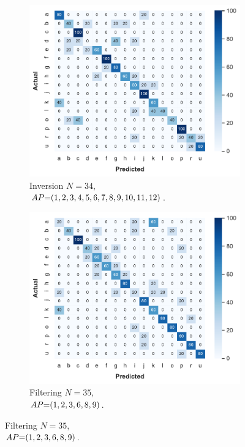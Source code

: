 \begin{figure}[!tb]
    \begin{subfigure}{.49\textwidth}
        \centering
        \includegraphics[width=.99\linewidth]{Figures/RadarExperiments/Datasets/SensorsComparison/Walabot/confusion-inversion.pdf}
        \vspace{-18pt}
        \captionsetup{width=.95\linewidth}
        \caption{Inversion $N{=}34$, \\ $\splitatcommas{AP{=}(1,2,3,4,5,6,7,8,9,10,11,12)}$.}
        \label{fig:radar-experiments:sensors:walabot-confusion:inversion}
    \end{subfigure}
    \begin{subfigure}{.49\textwidth}
        \centering
        \includegraphics[width=.99\linewidth]{Figures/RadarExperiments/Datasets/SensorsComparison/Walabot/confusion-filtering.pdf}
        \vspace{-18pt}
        \captionsetup{width=.95\linewidth}
        \caption{Filtering $N{=}35$, \\ $\splitatcommas{AP{=}(1, 2, 3, 6, 8, 9)}$.}
        \label{fig:radar-experiments:sensors:walabot-confusion:filtering}
    \end{subfigure}
    

\end{figure}
